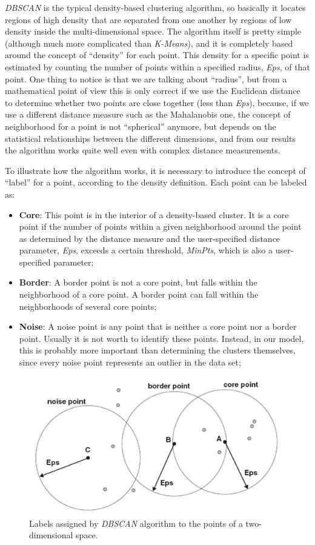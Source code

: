 \documentclass[12pt,a4paper,cucitura]{toptesi}
\begin{document}
\emph{DBSCAN} is the typical density-based clustering algorithm, so basically it locates regions of high density that are separated from one another by regions of low density inside the multi-dimensional space.
The algorithm itself is pretty simple (although much more complicated than \emph{K-Means}), and it is completely based around the concept of ``density'' for each point.
This density for a specific point is estimated by counting the number of points within a specified radius, \emph{Eps}, of that point.
One thing to notice is that we are talking about ``radius'', but from a mathematical point of view this is only correct if we use the Euclidean distance to determine whether two points are close together (less than \emph{Eps}), because, if we use a different distance measure such as the Mahalanobis one, the concept of neighborhood for a point is not ``spherical'' anymore, but depends on the statistical relationships between the different dimensions, and from our results the algorithm works quite well even with complex distance measurements.

To illustrate how the algorithm works, it is necessary to introduce the concept of ``label'' for a point, according to the density definition.
Each point can be labeled as:

\begin{itemize}
\item \textbf{Core}: This point is in the interior of a density-based cluster. It is a core point if the number of points within a given neighborhood around the point as determined by the distance measure and the user-specified distance parameter, \emph{Eps}, exceeds a certain threshold, \emph{MinPts}, which is also a user-specified parameter;
\item \textbf{Border}: A border point is not a core point, but falls within the neighborhood of a core point. A border point can fall within the neighborhoods of several core points;
\item \textbf{Noise}: A noise point is any point that is neither a core point nor a border point. Usually it is not worth to identify these points. Instead, in our model, this is probably more important than determining the clusters themselves, since every noise point represents an outlier in the data set;
\end{itemize}

\begin{figure}
\centering
\includegraphics[width=0.8\linewidth]{dbscan.png}
\caption[\emph{DBSCAN} points]{Labels assigned by \emph{DBSCAN} algorithm to the points of a two-dimensional space.}
\end{figure}
\end{document}
